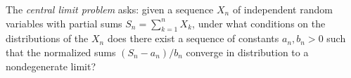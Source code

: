 The \textit{central limit problem} asks: given a sequence $X_n$ of independent random variables with partial sums $S_n = \sum_{k=1}^{n} X_k$, under what conditions on the distributions of the $X_n$ does there exist a sequence of constants $a_n, b_n > 0$ such that the normalized sums $(S_n - a_n)/b_n$ converge in distribution to a nondegenerate limit?

